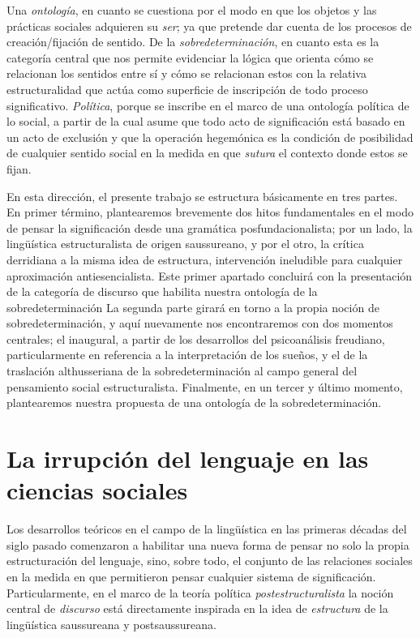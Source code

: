 Una \emph{ontología}, en cuanto se cuestiona por el modo en que los objetos y las prácticas sociales adquieren su \emph{ser}; ya que pretende dar cuenta de los procesos de creación/fijación de sentido. De la \emph{sobredeterminación}, en cuanto esta es la categoría central que nos permite evidenciar la lógica que orienta cómo se relacionan los sentidos  entre sí y cómo se relacionan estos con la relativa estructuralidad que actúa como superficie de inscripción de todo proceso significativo. \emph{Política}, porque se inscribe en el marco de una ontología política de lo social, a partir de la cual asume que todo acto de significación está basado en un acto de exclusión y que la operación hegemónica es la condición de posibilidad de cualquier sentido social en la medida en que \emph{sutura} el contexto donde estos se fijan.

En esta dirección, el presente trabajo se estructura básicamente en tres partes. En primer término, plantearemos brevemente dos hitos fundamentales en el modo de pensar la significación desde una gramática posfundacionalista; por un lado, la lingüística estructuralista de origen saussureano, y por el otro, la crítica derridiana a la misma idea de estructura, intervención ineludible para cualquier aproximación antiesencialista. Este primer apartado concluirá con la presentación de la categoría de discurso que habilita nuestra ontología de la sobredeterminación La segunda parte girará en torno a la propia noción de sobredeterminación, y aquí nuevamente nos encontraremos con dos momentos centrales; el inaugural, a partir de los desarrollos del psicoanálisis freudiano, particularmente en referencia a la interpretación de los sueños, y el de la traslación althusseriana de la sobredeterminación al campo general del pensamiento social estructuralista. Finalmente, en un tercer y último momento, plantearemos nuestra propuesta de una ontología de la sobredeterminación.

\section{La irrupción del lenguaje en las ciencias sociales}

Los desarrollos teóricos en el campo de la lingüística en las primeras décadas del siglo pasado comenzaron a habilitar una nueva forma de pensar no solo la propia estructuración del lenguaje, sino, sobre todo, el conjunto de las relaciones sociales en la medida en que permitieron pensar cualquier sistema de significación. Particularmente, en el marco de la teoría política \emph{postestructuralista} la noción central de \emph{discurso} está directamente inspirada en la idea de \emph{estructura} de la lingüística saussureana y postsaussureana.

